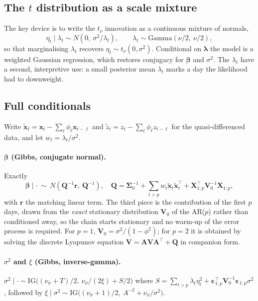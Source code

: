 \documentclass[11pt]{article}
\begin{document}
\subsection{The $t$ distribution as a scale mixture}

The key device is to write the $t_\nu$ innovation as a continuous mixture of
normals,
\begin{equation}
\eta_t \mid \lambda_t \sim N\!\left(0,\ \sigma^2/\lambda_t\right),
\qquad
\lambda_t \sim \mathrm{Gamma}(\nu/2,\ \nu/2),
\end{equation}
so that marginalising $\lambda_t$ recovers $\eta_t \sim t_\nu(0,\sigma^2)$.
Conditional on $\boldsymbol\lambda$ the model is a weighted Gaussian
regression, which restores conjugacy for $\boldsymbol\beta$ and $\sigma^2$.
The $\lambda_t$ have a second, interpretive use: a small posterior mean
$\lambda_t$ marks a day the likelihood had to downweight.

\subsection{Full conditionals}

Write $\tilde{\mathbf{x}}_t = \mathbf{x}_t - \sum_\ell \phi_\ell \mathbf{x}_{t-\ell}$
and $\tilde z_t = z_t - \sum_\ell \phi_\ell z_{t-\ell}$ for the quasi-differenced
data, and let $w_t = \lambda_t/\sigma^2$.

\paragraph{$\boldsymbol\beta$ (Gibbs, conjugate normal).} Exactly
\[
\boldsymbol\beta \mid \cdot \ \sim\ N\!\left(\mathbf{Q}^{-1}\mathbf{r},\ \mathbf{Q}^{-1}\right),
\quad
\mathbf{Q} = \boldsymbol\Sigma_0^{-1}
 + \sum_{t>p} w_t \tilde{\mathbf{x}}_t\tilde{\mathbf{x}}_t^{\top}
 + \mathbf{X}_{1:p}^{\top}\mathbf{V}_0^{-1}\mathbf{X}_{1:p},
\]
with $\mathbf{r}$ the matching linear term. The third piece is the contribution
of the first $p$ days, drawn from the \emph{exact} stationary distribution
$\mathbf{V}_0$ of the AR($p$) rather than conditioned away, so the chain starts
stationary and no warm-up of the error process is required. For $p=1$,
$\mathbf{V}_0 = \sigma^2/(1-\phi^2)$; for $p=2$ it is obtained by solving the
discrete Lyapunov equation $\mathbf{V} = \mathbf{A}\mathbf{V}\mathbf{A}^{\top}+\mathbf{Q}$
in companion form.

\paragraph{$\sigma^2$ and $\xi$ (Gibbs, inverse-gamma).}
$\sigma^2 \mid \cdot \sim \mathrm{IG}\big((\nu_\sigma + T)/2,\ \nu_\sigma/(2\xi) + S/2\big)$
where $S = \sum_{t>p}\lambda_t\eta_t^2 + \boldsymbol\varepsilon_{1:p}^{\top}\mathbf{V}_0^{-1}\boldsymbol\varepsilon_{1:p}\sigma^2$,
followed by
$\xi \mid \sigma^2 \sim \mathrm{IG}\big((\nu_\sigma+1)/2,\ A^{-2} + \nu_\sigma/\sigma^2\big)$.
\end{document}

